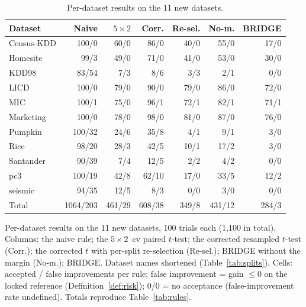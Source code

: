 \begin{table}[!htb]
\centering
\scriptsize
\setlength{\tabcolsep}{2.2pt}
\caption{Per-dataset results on the 11 new datasets.}
\label{tab:perdataset}
\begin{tabular}{@{}lrrrrrr@{}}
\toprule
Dataset & Naive & $5\times2$ & Corr. & Re-sel. & No-m. & BRIDGE \\
\midrule
Census-KDD & 100/0 & 60/0 & 86/0 & 40/0 & 55/0 & 17/0 \\
Homesite & 99/3 & 49/0 & 71/0 & 41/0 & 53/0 & 30/0 \\
KDD98 & 83/54 & 7/3 & 8/6 & 3/3 & 2/1 & 0/0 \\
LICD & 100/0 & 79/0 & 90/0 & 79/0 & 86/0 & 72/0 \\
MIC & 100/1 & 75/0 & 96/1 & 72/1 & 82/1 & 71/1 \\
Marketing & 100/0 & 78/0 & 98/0 & 81/0 & 87/0 & 76/0 \\
Pumpkin & 100/32 & 24/6 & 35/8 & 4/1 & 9/1 & 3/0 \\
Rice & 98/20 & 28/3 & 42/5 & 10/1 & 17/2 & 3/0 \\
Santander & 90/39 & 7/4 & 12/5 & 2/2 & 4/2 & 0/0 \\
pc3 & 100/19 & 42/8 & 62/10 & 17/0 & 33/5 & 12/2 \\
seismic & 94/35 & 12/5 & 8/3 & 0/0 & 3/0 & 0/0 \\
Total & 1064/203 & 461/29 & 608/38 & 349/8 & 431/12 & 284/3 \\
\bottomrule
\end{tabular}

\vspace{2pt}
\parbox{\linewidth}{\justifying\scriptsize *Per-dataset results on the 11 new datasets, 100 trials each (1,100 in total). Columns: the naive rule; the $5\times2$~cv paired $t$-test; the corrected resampled $t$-test (Corr.); the corrected $t$ with per-split re-selection (Re-sel.); BRIDGE without the margin (No-m.); BRIDGE. Dataset names shortened (Table~\ref{tab:splits}). Cells: accepted / false improvements per rule; false improvement = gain $\le 0$ on the locked reference (Definition~\ref{def:risk}); 0/0 = no acceptance (false-improvement rate undefined). Totals reproduce Table~\ref{tab:rules}.}
\end{table}
